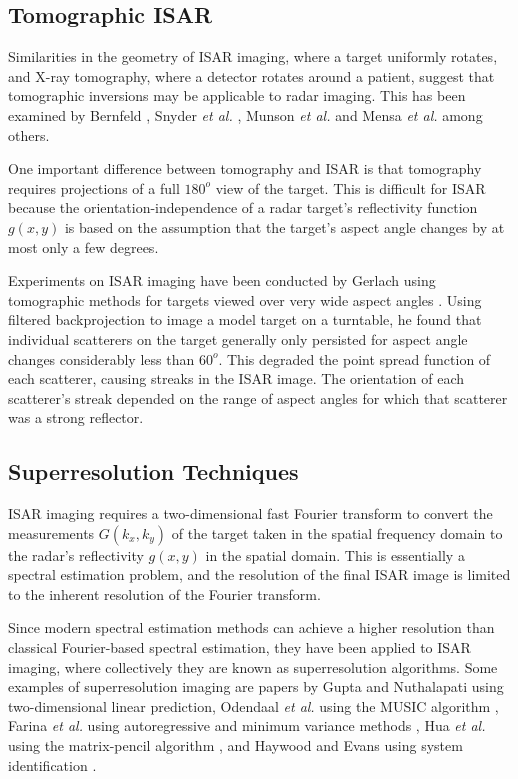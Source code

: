 \subsection{Tomographic ISAR}

Similarities in the geometry of ISAR imaging, where a target uniformly 
rotates, and X-ray tomography, where a detector rotates around a patient,
suggest that tomographic inversions may be applicable to radar imaging.
This has been examined by Bernfeld \cite{Ber84}, Snyder {\em et al.}
\cite{Sny86}, Munson {\em et al.\/} \cite{Mun83} and Mensa {\em et al.\/}
\cite{Men83,Men91} among others.  

One important difference between tomography and ISAR is that tomography
requires projections of a full $180^o$ view of the target.  
This is difficult for ISAR because the orientation-independence of a radar
target's reflectivity function $g(x,y)$ is based on the assumption that the
target's aspect angle changes by at most only a few degrees.

Experiments on ISAR imaging have been conducted by Gerlach using tomographic
methods for targets viewed over very wide aspect angles \cite{Ger89}. Using
filtered backprojection to image a model target on a turntable, he found
that individual scatterers on the target generally only persisted for aspect
angle changes considerably less than $60^o$.  This degraded the point spread
function of each scatterer, causing streaks in the ISAR image.  The
orientation of each scatterer's streak depended on the range of aspect
angles for which that scatterer was a strong reflector.

\subsection{Superresolution Techniques}
\label{ii sec:sr}

ISAR imaging requires a two-dimensional fast Fourier transform to convert the measurements
$G(k_x,k_y)$ of the target taken in the spatial frequency domain to the
radar's reflectivity $g(x,y)$ in the spatial domain.  This is essentially a
spectral estimation problem, and the resolution	of the final ISAR image is
limited to the inherent resolution of the Fourier transform.

Since modern spectral estimation methods can achieve a higher resolution
than classical Fourier-based spectral estimation, they have been applied to
ISAR imaging, where collectively they are known as superresolution
algorithms.  Some examples of superresolution imaging are papers by
Gupta \cite{Gup94} and Nuthalapati \cite{Nut92} using two-dimensional linear
prediction, Odendaal {\em et al.\/} using the MUSIC algorithm \cite{Ode94},
Farina {\em et al.\/} using autoregressive and minimum variance methods
\cite{Far94}, Hua {\em et al.\/} using the matrix-pencil algorithm
\cite{Hua93,Hua94}, and Haywood and Evans using system identification
\cite{Hay92b,Hay92c}.


